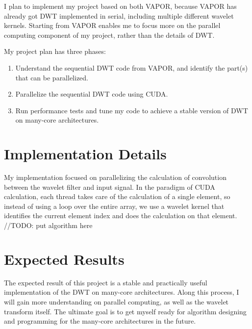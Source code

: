 \documentclass{article}
\begin{document}
I plan to implement my project based on both VAPOR, because 
VAPOR has already got DWT implemented in serial, 
including multiple different wavelet kernels.
%
Starting from VAPOR enables me to focus more on the parallel computing 
component of my project, rather than the details of DWT.

%

%
%
%

My project plan has three phases:
\begin{enumerate}
\item Understand the sequential DWT code from VAPOR, 
and identify the part(s) that can be parallelized.
%
\item Parallelize the sequential DWT code using CUDA.
%
\item Run performance tests and tune my code to achieve a stable version
of DWT on many-core architectures.
\end{enumerate}


\section{Implementation Details}
\label{sec:implementation}
%
My implementation focused on parallelizing the calculation of convolution 
between the wavelet filter and input signal.
%
In the paradigm of CUDA calculation, each thread takes care of the
calculation of a single element, so instead of using a loop over the entire
array, we use a wavelet kernel that identifies the current element index
and does the calculation on that element.
%
//TODO: put algorithm here

\section{Expected Results}
%
The expected result of this project is a stable and practically useful 
implementation of the DWT on many-core architectures.
%
Along this process, I will gain more understanding on parallel
computing, as well as the wavelet transform itself.
%
The ultimate goal is to get myself ready for algorithm designing and 
programming for the many-core architectures in the future.







\end{document}
